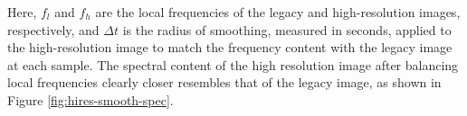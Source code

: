     Here, $f_l$ and $f_h$ are the local frequencies of the legacy and high-resolution images, respectively, and $\Delta t$ is the radius of smoothing, measured in seconds, applied to the high-resolution image to match the frequency content with the legacy image at each sample. 
    The spectral content of the high resolution image after balancing local frequencies clearly closer resembles that of the legacy image, as shown in Figure \ref{fig:hires-smooth-spec}.
